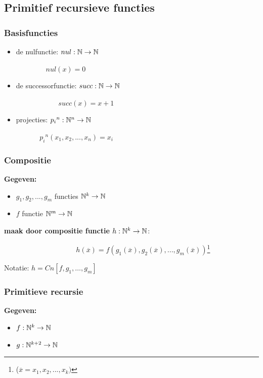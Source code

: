 \subsection{Primitief recursieve functies}
\subsubsection{Basisfuncties}

\begin{itemize}
\item 
de nulfunctie: $nul : \mathbb{N} \rightarrow \mathbb{N}$

$~~~~~~~~~~~~~~~~~~~nul(x) = 0$


\item 
de successorfunctie: $succ : \mathbb{N} \rightarrow \mathbb{N}$ 

$~~~~~~~~~~~~~~~~~~~~~~~~~~~succ(x) = x+1$

\item 
projecties: ${p_i}^n : \mathbb{N}^n \rightarrow \mathbb{N}$

$~~~~~~~~~~~~~~~{p_i}^n(x_1,x_2,...,x_n) = x_i$

\end{itemize}


\subsubsection{Compositie}


{\bf Gegeven:}
\begin{itemize}
\item
$g_1, g_2, ..., g_m$ functies $\mathbb{N}^k \rightarrow \mathbb{N}$

\item 
$f$ functie $\mathbb{N}^m \rightarrow \mathbb{N}$
\end{itemize}

{\bf maak door compositie functie $h : \mathbb{N}^k \rightarrow \mathbb{N}$}:

$~~~~~~~~~~~~~~~~~~~~~~~~~~~~~~~~~~~~~~~~~~~~~~h(\overline{x}) = f(g_1(\overline{x}), g_2(\overline{x}), ..., g_m(\overline{x}))$\footnote{($\overline{x} = x_1,x_2,...,x_k)$}


Notatie: $h = Cn[f,g_1,\ldots,g_m]$

\subsubsection{Primitieve recursie}

{\bf Gegeven:}
\begin{itemize}
\item
$ f: \mathbb{N}^k \rightarrow \mathbb{N}$

\item
$g: \mathbb{N}^{k+2}  \rightarrow \mathbb{N}$

\end{itemize}

